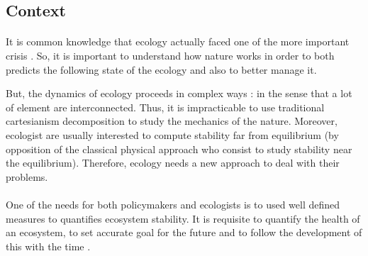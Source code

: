 \documentclass{article}
\begin{document}
\newpage


\subsection*{Context}


\paragraph{} 

It is common knowledge that ecology actually faced one of the more important crisis \cite{oosthoek_humanity_2005}. So, it is important to understand how nature works in order to both predicts the following state of the ecology and also to better manage it.

But, the dynamics of ecology proceeds in complex ways : in the sense that a lot of element are interconnected. Thus, it is impracticable to use traditional cartesianism decomposition to study the mechanics of the nature. Moreover, ecologist are usually interested to compute stability far from equilibrium (by opposition of the classical physical approach who consist to study stability near the equilibrium). %
Therefore, ecology needs a new approach to deal with their problems. 




\paragraph{} %
One of the needs for both policymakers and ecologists is to used well defined measures to quantifies ecosystem stability. It is requisite to quantify the health of an ecosystem, to set accurate goal for the future and to follow the development of this with the time \cite{donohue_navigating_2016} \cite{mayer2008strengths}. 
\end{document}

